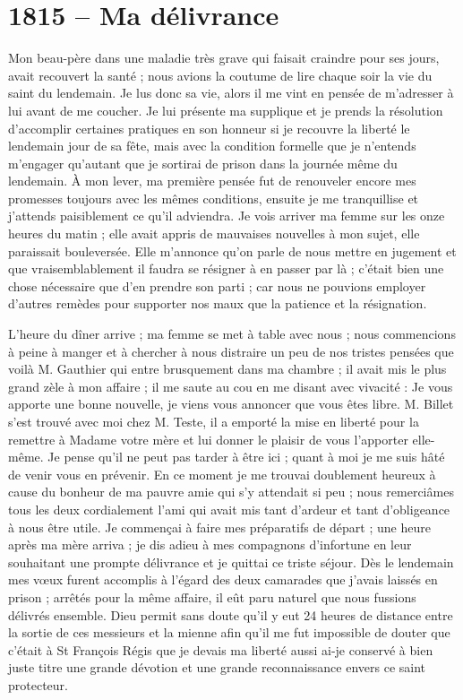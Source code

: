 \documentclass[11pt,a4paper]{report}
\begin{document}
\section*{1815 -- Ma délivrance}

Mon beau-père dans une maladie très grave qui faisait craindre pour ses jours, avait recouvert la santé ; nous avions la coutume de lire chaque soir la vie du saint du lendemain. Je lus donc sa vie, alors il me vint en pensée de m'adresser à lui avant de me coucher. Je lui présente ma supplique et je prends la résolution d'accomplir certaines pratiques en son honneur si je recouvre la liberté le lendemain jour de sa fête, mais avec la condition formelle que je n'entends m'engager qu'autant que je sortirai de prison dans la journée même du lendemain. À mon lever, ma première pensée fut de renouveler encore mes promesses toujours avec les mêmes conditions, ensuite je me tranquillise et j'attends paisiblement ce qu'il adviendra. Je vois arriver ma femme sur les onze heures du matin ; elle avait appris de mauvaises nouvelles à mon sujet, elle paraissait bouleversée. Elle m'annonce qu'on parle de nous mettre en jugement et que vraisemblablement il faudra se résigner à en passer par là ; c'était bien une chose nécessaire que d'en prendre son parti ; car nous ne pouvions employer d'autres remèdes pour supporter nos maux que la patience et la résignation.

L'heure du dîner arrive ; ma femme se met à table avec nous ; nous commencions à peine à manger et à chercher à nous distraire un peu de nos tristes pensées que voilà M. Gauthier qui entre brusquement dans ma chambre ; il avait mis le plus grand zèle à mon affaire ; il me saute au cou en me disant avec vivacité : Je vous apporte une bonne nouvelle, je viens vous annoncer que vous êtes libre. M. Billet s'est trouvé avec moi chez M. Teste, il a emporté la mise en liberté pour la remettre à Madame votre mère et lui donner le plaisir de vous l'apporter elle-même. Je pense qu'il ne peut pas tarder à être ici ; quant à moi je me suis hâté de venir vous en prévenir. En ce moment je me trouvai doublement heureux à cause du bonheur de ma pauvre amie qui s'y attendait si peu ; nous remerciâmes tous les deux cordialement l'ami qui avait mis tant d'ardeur et tant d'obligeance à nous être utile. Je commençai à faire mes préparatifs de départ ; une heure après ma mère arriva ; je dis adieu à mes compagnons d'infortune en leur souhaitant une prompte délivrance et je quittai ce triste séjour. Dès le lendemain mes vœux furent accomplis à l'égard des deux camarades que j'avais laissés en prison ; arrêtés pour la même affaire, il eût paru naturel que nous fussions délivrés ensemble. Dieu permit sans doute qu'il y eut 24 heures de distance entre la sortie de ces messieurs et la mienne afin qu'il me fut impossible de douter que c'était à St François Régis que je devais ma liberté aussi ai-je conservé à bien juste titre une grande dévotion et une grande reconnaissance envers ce saint protecteur.
\end{document}
